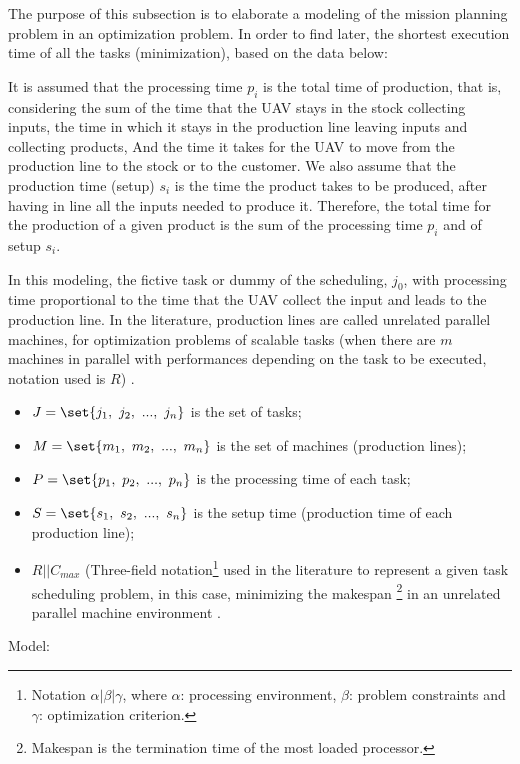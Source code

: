 \documentclass[conference,harvard,brazil,english]{sbatex}
\begin{document}
The purpose of this subsection is to elaborate a modeling of the mission planning problem in an optimization problem. In order to find later, the shortest execution time of all the tasks (minimization), based on the data below:

It is assumed that the processing time $ p_i $ is the total time of production, that is, considering the sum of the time that the UAV stays in the stock collecting inputs, the time in which it stays in the production line leaving inputs and collecting products, And the time it takes for the UAV to move from the production line to the stock or to the customer. We also assume that the production time (setup) $s_i$ is the time the product takes to be produced, after having in line all the inputs needed to produce it. Therefore, the total time for the production of a given product is the sum of the processing time $p_i$ and of setup $s_i$.

In this modeling, the fictive task or dummy of the scheduling, $j_0$, with processing time proportional to the time that the UAV collect the input and leads to the production line. In the literature, production lines are called unrelated parallel machines, for optimization problems of scalable tasks (when there are $m$ machines in parallel with performances depending on the task to be executed, notation used is $R$) \cite{du2008scheduling}.


\begin{itemize}
\item $J = \set{j_1,~j_2,~...,~j_n}$ is the set of tasks;
\item $M = \set{m_1,~m_2,~...,~m_n}$ is the set of machines (production lines);
\item $P = \set{p_1,~p_2,~...,~p_n}$ is the processing time of each task;
\item $S = \set{s_1,~s_2,~...,~s_n}$ is the setup time (production time of each production line);
\item $R||C_{max}$ (Three-field notation\footnote{Notation $\alpha | \beta | \gamma$, where $\alpha$: processing environment, $\beta$: problem constraints and $\gamma$: optimization criterion.} used in the literature to represent a given task scheduling problem, in this case, minimizing the makespan \footnote{Makespan is the termination time of the most loaded processor.} in an unrelated parallel machine environment \cite{graham1979optimization}.
\end{itemize}

Model:
\end{document}
